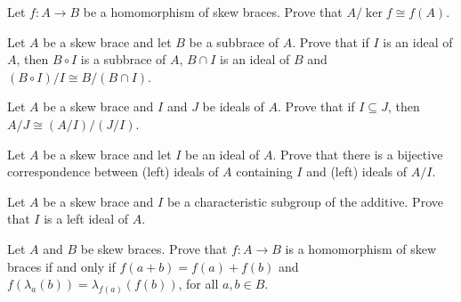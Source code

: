 \begin{exercise}\label{ex:thmiso1}
    Let $f : A\to B$ be a homomorphism of skew braces. Prove that $A/\ker f \cong f(A)$.
\end{exercise}

\begin{exercise}\label{ex:thmiso2}
    Let $A$ be a skew brace and let $B$ be a subbrace of $A$. Prove that if $I$ is an ideal of $A$, then $B\circ I$ is a subbrace of $A$, $B\cap I$ is an ideal of $B$ and $(B\circ I)/I \cong B/(B\cap I)$.
\end{exercise}

\begin{exercise}\label{ex:thmiso3}
    Let $A$ be a skew brace and $I$ and $J$ be ideals of $A$. Prove that if $I\subseteq J$, then $A/J\cong (A/I)/(J/I)$.
\end{exercise}

\begin{exercise}\label{ex:thmiso4}
    Let $A$ be a skew brace and let $I$ be an ideal of $A$. Prove that there is a bijective correspondence between (left) ideals of $A$ containing $I$ and (left) ideals of $A/I$.
\end{exercise}

\begin{exercise}
    Let $A$ be a skew brace and $I$ be a characteristic subgroup of the additive. Prove that $I$ is a left ideal of $A$.
\end{exercise}

\begin{exercise}
    Let $A$ and $B$ be skew braces. Prove that $f :A \to B$ is a homomorphism of skew braces if and only if $f(a+b)= f(a)+f(b)$ and $f(\lambda_a(b))=\lambda_{f(a)}(f(b))$, for all $a,b\in B$.
\end{exercise}
